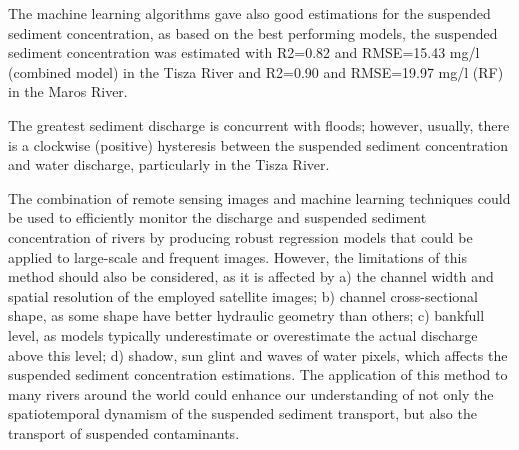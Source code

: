 {The machine learning algorithms gave also good estimations for the suspended sediment concentration, as based on the best performing models, the suspended sediment concentration was estimated with R2=0.82 and RMSE=15.43 mg/l (combined model) in the Tisza River and R2=0.90 and RMSE=19.97 mg/l (RF) in the Maros River. 

The greatest sediment discharge is concurrent with floods; however, usually, there is a clockwise (positive) hysteresis between the suspended sediment concentration and water discharge, particularly in the Tisza River.

The combination of remote sensing images and machine learning techniques could be used to efficiently monitor the discharge and suspended sediment concentration of rivers by producing robust regression models that could be applied to large-scale and frequent images. However, the limitations of this method should also be considered, as it is affected by a) the channel width and spatial resolution of the employed satellite images; b) channel cross-sectional shape, as some shape have better hydraulic geometry than others; c) bankfull level, as models typically underestimate or overestimate the actual discharge above this level; d) shadow, sun glint and waves of water pixels, which affects the suspended sediment concentration estimations. The application of this method to many rivers around the world could enhance our understanding of not only the spatiotemporal dynamism of the suspended sediment transport, but also the transport of suspended contaminants.
}
{
}

